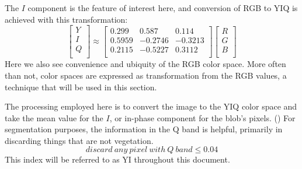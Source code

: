 \documentclass[letterpaper]{report}
\begin{document}
{The $I$ component is the feature of interest here, and conversion of RGB to YIQ is achieved with this transformation:
\begin{equation}
	\begin{bmatrix}
	Y \\[0.3em]
	I \\[0.3em]
	Q \\[0.3em]
	\end{bmatrix}
	\approx
	\begin{bmatrix}
	0.299 & 0.587 & 0.114 \\[0.3em]
	0.5959 & -0.2746 & -0.3213\\[0.3em]
	0.2115 & -0.5227 & 0.3112 \\[0.3em]
	\end{bmatrix}
	\begin{bmatrix}
	R \\[0.3em]
	G \\[0.3em]
	B \\[0.3em]
	\end{bmatrix}	
\end{equation}
Here we also see convenience and ubiquity of the RGB color space. More often than not, color spaces are expressed as transformation from the RGB values, a technique that will be used in this section.



The processing employed here is to convert the image to the YIQ color space and take the mean value for the $I$, or in-phase component for the blob's pixels. (\cite{MathWorks_undated-jg}) For segmentation purposes, the information in the Q band is helpful, primarily in discarding things that are not vegetation.
\begin{equation}\label{eqn:yiq-index}
	discard\ any\ pixel\ with\ Q\ band\leq 0.04
\end{equation}
This index will be referred to as YI throughout this document.

}
\end{document}
